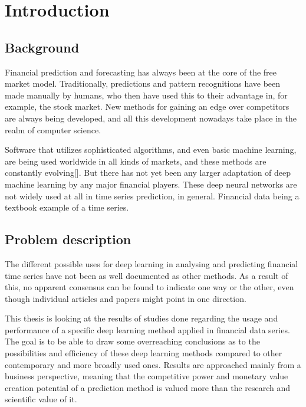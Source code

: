 \section{Introduction}

\subsection{Background}

Financial prediction and forecasting has always been at the core of the free market model. Traditionally, predictions and pattern recognitions have been made manually by humans, who then have used this to their advantage in, for example, the stock market. New methods for gaining an edge over competitors are always being developed, and all this development nowadays take place in the realm of computer science.

Software that utilizes sophisticated algorithms, and even basic machine learning, are being used worldwide in all kinds of markets, and these methods are constantly evolving[]. But there has not yet been any larger adaptation of deep machine learning by any major financial players. These deep neural networks are not widely used at all in time series prediction, in general. Financial data being a textbook example of a time series.


\subsection{Problem description}


The different possible uses for deep learning in analysing and predicting financial time series have not been as well documented as other methods. As a result of this, no apparent consensus can be found to indicate one way or the other, even though individual articles and papers might point in one direction.

This thesis is looking at the results of studies done regarding the usage and performance of a specific deep learning method applied in financial data series. The goal is to be able to draw some overreaching conclusions as to the possibilities and efficiency of these deep learning methods compared to other contemporary and more broadly used ones. Results are approached mainly from a business perspective, meaning that the competitive power and monetary value creation potential of a prediction method is valued more than the research and scientific value of it.


